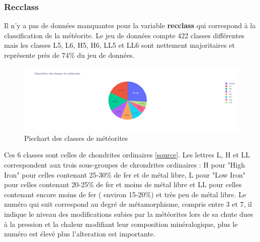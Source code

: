 \documentclass[12pt]{article}
\begin{document}
\subsubsection*{Recclass}
Il n'y a pas de données manquantes pour la variable \textbf{recclass} qui correspond à la classification de la météorite. Le jeu de données compte 422 classes différentes mais les classes L5, L6, H5, H6, LL5 et LL6 sont nettement majoritaires et représente près de 74\% du jeu de données.
\begin{figure}[H]
\centering
\includegraphics[width=15cm]{Images/exploration/recclass_piechart_class.png}
\caption{Piechart des classes de météorites}
\end{figure}
Ces 6 classes sont celles de chondrites ordinaires [\href{http://www.meteorite.fr/en/classification/}{source}]. Les lettres L, H et LL correspondent aux trois sous-groupes de chrondrites ordinaires : H pour "High Iron" pour celles contenant 25-30\% de fer et de métal libre, L pour "Low Iron" pour celles contenant 20-25\% de fer et moins de métal libre et LL pour celles contenant encore moins de fer ( environ 15-20\%) et très peu de métal libre. Le numéro qui suit correspond au degré de métamorphisme, compris entre 3 et 7, il indique le niveau des modifications subies par la météorites lors de sa chute dues à la pression et la chaleur modifiant leur composition minéralogique, plus le numéro est élevé plus l'alteration est importante.
\end{document}
